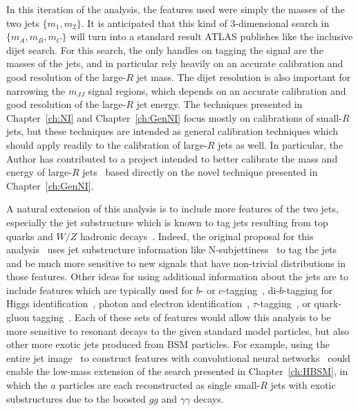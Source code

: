 In this iteration of the analysis, the features used were simply the masses of the two jets $\{m_1,m_2\}$.
It is anticipated that this kind of 3-dimensional search in $\{m_A,m_B,m_C\}$ will turn into a standard result ATLAS publishes like the inclusive dijet search.
For this search, the only handles on tagging the signal are the masses of the jets, and in particular rely heavily on an accurate calibration and good resolution of the large-$R$ jet mass.
The dijet resolution is also important for narrowing the $m_{JJ}$ signal regions, which depends on an accurate calibration and good resolution of the large-$R$ jet energy.
The techniques presented in Chapter~\ref{ch:NI} and Chapter~\ref{ch:GenNI} focus mostly on calibrations of small-$R$ jets, but these techniques are intended as general calibration techniques which should apply readily to the calibration of large-$R$ jets as well.
In particular, the Author has contributed to a project intended to better calibrate the mass and energy of large-$R$ jets~\cite{ATL-PHYS-PUB-2020-001} based directly on the novel technique presented in Chapter~\ref{ch:GenNI}.

A natural extension of this analysis is to include more features of the two jets, especially the jet substructure which is known to tag jets resulting from top quarks and $W/Z$ hadronic decays~\cite{Aaboud:2018psm}.
Indeed, the original proposal for this analysis~\cite{Collins:2018epr} uses jet substructure information like N-subjettiness~\cite{Thaler:2010tr} to tag the jets and be much more sensitive to new signals that have non-trivial distributions in those features.
Other ideas for using additional information about the jets are to include features which are typically used for $b$- or $c$-tagging~\cite{ref:TODO}, di-$b$-tagging for Higgs identification~\cite{ref:TODO}, photon and electron identification~\cite{ref:TODO}, $\tau$-tagging~\cite{ref:TODO}, or quark-gluon tagging~\cite{ATL-PHYS-PUB-2017-009}.
Each of these sets of features would allow this analysis to be more sensitive to resonant decays to the given standard model particles, but also other more exotic jets produced from BSM particles.
For example, using the entire jet image~\cite{ATL-PHYS-PUB-2017-017} to construct features with convolutional neural networks~\cite{ref:TODO} could enable the low-mass extension of the search presented in Chapter~\ref{ch:HBSM}, in which the $a$ particles are each reconstructed as single small-$R$ jets with exotic substructures due to the boosted $gg$ and $\gamma\gamma$ decays.

